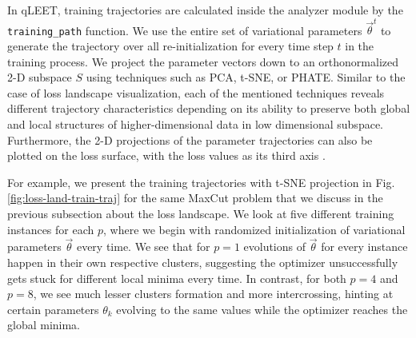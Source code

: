 In qLEET, training trajectories are calculated inside the analyzer module by the \texttt{training\_path} function. We use the entire set of variational parameters $\vec{\theta}^{t}$ to generate the trajectory over all re-initialization for every time step $t$ in the training process. We project the parameter vectors down to an orthonormalized 2-D subspace $S$ using techniques such as PCA, t-SNE, or PHATE. Similar to the case of loss landscape visualization, each of the mentioned techniques reveals different trajectory characteristics depending on its ability to preserve both global and local structures of higher-dimensional data in low dimensional subspace. Furthermore, the 2-D projections of the parameter trajectories can also be plotted on the loss surface, with the loss values as its third axis \cite{training-trajectories}.

For example, we present the training trajectories with t-SNE projection in Fig. \ref{fig:loss-land-train-traj} for the same MaxCut problem that we discuss in the previous subsection about the loss landscape. We look at five different training instances for each $p$, where we begin with randomized initialization of variational parameters $\vec{\theta}$ every time. We see that for $p=1$ evolutions of $\vec{\theta}$ for every instance happen in their own respective clusters, suggesting the optimizer unsuccessfully gets stuck for different local minima every time. In contrast, for both $p=4$ and $p=8$, we see much lesser clusters formation and more intercrossing, hinting at certain parameters $\theta_k$ evolving to the same values while the optimizer reaches the global minima. 


